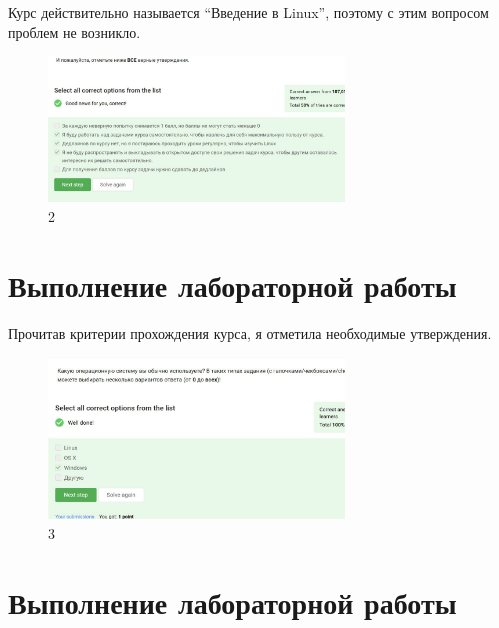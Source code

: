 Курс действительно называется ``Введение в Linux'', поэтому с этим
вопросом проблем не возникло.

\begin{figure}
\hypertarget{fig:002}{%
\centering
\includegraphics[width=0.7\textwidth,height=\textheight]{image/2.png}
\caption{2}\label{fig:002}
}
\end{figure}

\hypertarget{ux432ux44bux43fux43eux43bux43dux435ux43dux438ux435-ux43bux430ux431ux43eux440ux430ux442ux43eux440ux43dux43eux439-ux440ux430ux431ux43eux442ux44b-2}{%
\section{Выполнение лабораторной
работы}\label{ux432ux44bux43fux43eux43bux43dux435ux43dux438ux435-ux43bux430ux431ux43eux440ux430ux442ux43eux440ux43dux43eux439-ux440ux430ux431ux43eux442ux44b-2}}

Прочитав критерии прохождения курса, я отметила необходимые утверждения.

\begin{figure}
\hypertarget{fig:003}{%
\centering
\includegraphics[width=0.7\textwidth,height=\textheight]{image/3.png}
\caption{3}\label{fig:003}
}
\end{figure}

\hypertarget{ux432ux44bux43fux43eux43bux43dux435ux43dux438ux435-ux43bux430ux431ux43eux440ux430ux442ux43eux440ux43dux43eux439-ux440ux430ux431ux43eux442ux44b-3}{%
\section{Выполнение лабораторной
работы}\label{ux432ux44bux43fux43eux43bux43dux435ux43dux438ux435-ux43bux430ux431ux43eux440ux430ux442ux43eux440ux43dux43eux439-ux440ux430ux431ux43eux442ux44b-3}}

